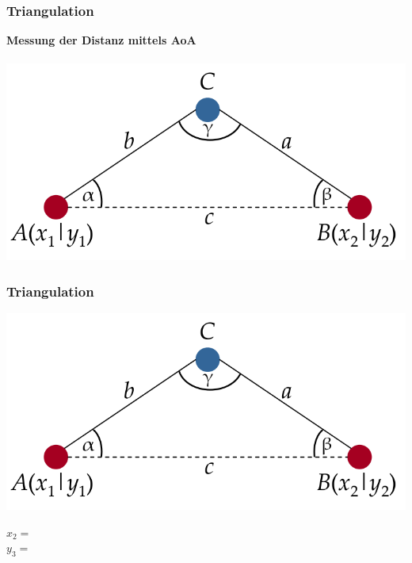 \begin{frame}
  \frametitle{Triangulation}

  \begin{center}
    \textbf{Messung der Distanz mittels AoA}\\~\\

    \includegraphics[scale=0.35]{img/triang}
  \end{center}
\end{frame}

\begin{frame}
  \frametitle{Triangulation}

  \begin{center}
    \includegraphics[scale=0.2]{img/triang}

    $x_{2} = $
    \\
    $y_{3} = $
  \end{center}
\end{frame}